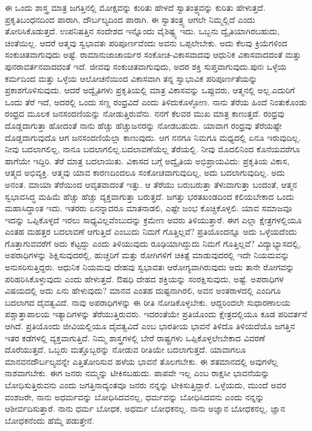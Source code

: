 ಈ ಒಂದು ಶಾಸ್ತ್ರ ಮಾತ್ರ ಜಗತ್ತಿನಲ್ಲಿ ಮೋಕ್ಷವನ್ನು ಕುರಿತು ಹೇಳದೆ ಸ್ವಾತಂತ್ರ್ಯವನ್ನು ಕುರಿತು ಹೇಳುತ್ತದೆ. ಪ್ರಕೃತಿಬಂಧನದಿಂದ ಪಾರಾಗಿ, ದೌರ್ಬಲ್ಯದಿಂದ ಪಾರಾಗಿ. ಈ ಸ್ವಾತಂತ್ರ್ಯ ಆಗಲೇ ನಿಮ್ಮಲ್ಲಿದೆ ಎಂದು ತೋರಿಸಿಕೊಡುತ್ತದೆ. ಉಪನಿಷತ್ತಿನ ಸಂದೇಶದ ಇನ್ನೊಂದು ವೈಶಿಷ್ಟ್ಯ ಇದು. ಒಬ್ಬನು ದ್ವೈತಿಯಾಗಿರಬಹುದು, ಚಿಂತೆಯಿಲ್ಲ. ಆದರೆ ಆತ್ಮವು ಸ್ವಭಾವತಃ ಪರಿಪೂರ್ಣವೆಂದು ಅವನು ಒಪ್ಪಲೇಬೇಕು. ಅದು ಕೆಲವು ಕ್ರಿಯೆಗಳಿಂದ ಸಂಕುಚಿತವಾಗುವುದು ಅಷ್ಟೆ. ರಾಮಾನುಜಾಚಾರ್ಯರ ಸಂಕೋಚ-ವಿಕಾಸವಾದವು ಆಧುನಿಕ ವಿಕಾಸವಾದದಂತೆ ಮತ್ತು ಪುನರಾವರ್ತನವಾದದಂತೆ  ಇದೆ. ಜೀವವು ಸಂಕುಚಿತವಾಗುವುದು, ಅದರ ಶಕ್ತಿ ಸುಪ್ತವಾಗುವುದು.\break ಪುನಃ ಒಳ್ಳೆಯ ಕರ್ಮದಿಂದ ಮತ್ತು ಒಳ್ಳೆಯ ಆಲೋಚನೆಯಿಂದ ವಿಕಾಸವಾಗಿ ತನ್ನ ಸ್ವಾಭಾವಿಕ ಪರಿಪೂರ್ಣತೆಯನ್ನು ಪ್ರಕಾಶಗೊಳಿಸುವುದು. ಆದರೆ ಅದ್ವೈತಿಗಳು ಪ್ರಕೃತಿಯಲ್ಲಿ ಮಾತ್ರ ವಿಕಾಸವನ್ನು ಒಪ್ಪುವರು, ಆತ್ಮನಲ್ಲಿ ಅಲ್ಲ.\break ಎದುರಿಗೆ ಒಂದು ತೆರೆ ಇದೆ, ಅದರಲ್ಲಿ ಒಂದು ಸಣ್ಣ ರಂಧ್ರವಿದೆ ಎಂದು ತಿಳಿದುಕೊಳ್ಳೋಣ. ನಾನು ತೆರೆಯ ಹಿಂದೆ ನಿಂತುಕೊಂಡು ರಂಧ್ರದ ಮೂಲಕ ಜನಸಂದಣಿಯನ್ನು ನೋಡುತ್ತಿರುವೆನು. ನನಗೆ ಕೆಲವರ ಮುಖ ಮಾತ್ರ ಕಾಣುತ್ತದೆ. ರಂಧ್ರವು ದೊಡ್ಡದಾಗುತ್ತಾ ಹೋದಂತೆ ನಾನು ಹೆಚ್ಚು ಹೆಚ್ಚು\break ಜನರನ್ನು ನೋಡಬಹುದು. ಯಾವಾಗ ರಂಧ್ರವು ತೆರೆಯಷ್ಟೇ ದೊಡ್ಡದಾಗುವುದೊ ಆಗ ಜನಸಂದಣಿಯೆಲ್ಲಾ ಕಾಣುವುದು. ಆಗ ನನಗೂ ನಿಮಗೂ ಮಧ್ಯದಲ್ಲಿ ಏನೂ ಇರುವುದಿಲ್ಲ. ನೀವು ಬದಲಾಗಲಿಲ್ಲ, ನಾನೂ ಬದಲಾಗಲಿಲ್ಲ.\break ಬದಲಾವಣೆಯೆಲ್ಲ ತೆರೆಯಲ್ಲಿ. ನೀವು ಮೊದಲಿನಿಂದ ಕೊನೆಯವರೆಗೂ ಹಾಗೆಯೇ ಇದ್ದಿರಿ. ತೆರೆ ಮಾತ್ರ ಬದಲಾಯಿತು. ವಿಕಾಸದ ಬಗ್ಗೆ ಅದ್ವೈತಿಯ ಅಭಿಪ್ರಾಯವಿದು: ಪ್ರಕೃತಿಯ ವಿಕಾಸ, ಆತ್ಮದ ಅಭಿವ್ಯಕ್ತಿ. ಆತ್ಮವು ಯಾವ ಕಾರಣದಿಂದಲೂ ಸಂಕೋಚವಾಗುವುದಿಲ್ಲ, ಅದು ಬದಲಾಗುವುದಿಲ್ಲ. ಅದು ಅನಂತ. ಮಾಯಾ ತೆರೆಯಿಂದ ಆವೃತವಾದಂತೆ ಇತ್ತು. ಆ ತೆರೆಯು ಬರುಬರುತ್ತಾ ತೆಳುವಾಗುತ್ತಾ ಬಂದಂತೆ, ಆತ್ಮನ ಸ್ವಭಾವಸಿದ್ಧ ಮಹಿಮೆ ಹೆಚ್ಚು ಹೆಚ್ಚು ವ್ಯಕ್ತವಾಗುತ್ತಾ ಬರುತ್ತದೆ. ಜಗತ್ತು ಭರತಖಂಡದಿಂದ ಕಲಿಯಬೇಕಾದ ಒಂದು ಮಹಾಸಿದ್ಧಾಂತ ಇದು. ಇತರರು ಏನನ್ನಾದರೂ ಮಾತನಾಡಲಿ, ಎಷ್ಟೇ ಜಂಭ ಕೊಚ್ಚಿಕೊಳ್ಳಲಿ. ಯಾವ ಸಮಾಜವೂ ಇದನ್ನು ಒಪ್ಪಿಕೊಳ್ಳದೆ ಇರಲು ಸಾಧ್ಯವಿಲ್ಲವೆಂಬುದನ್ನು ಕ್ರಮೇಣ ಅವರು ತಿಳಿಯುತ್ತಾರೆ. ಈಗ ಎಲ್ಲಾ ಕ್ಷೇತ್ರಗಳಲ್ಲಿಯೂ ಎಂತಹ ಮಹತ್ತರ ಬದಲಾವಣೆ ಆಗುತ್ತಿದೆ ಎಂಬುದು ನಿಮಗೆ ಗೊತ್ತಿಲ್ಲವೆ? ಪ್ರತಿಯೊಂದನ್ನೂ ಅದು ಒಳ್ಳೆಯದೆಂದು ಗೊತ್ತಾಗುವವರೆಗೆ ಅದು ಕೆಟ್ಟದ್ದು ಎಂದು ತಿಳಿಯುವುದು ರೂಢಿಯಾಗಿದ್ದುದು ನಿಮಗೆ ಗೊತ್ತಿಲ್ಲವೆ? ವಿದ್ಯಾ\-ಭ್ಯಾಸದಲ್ಲಿ, ಅಪರಾಧಿಗಳನ್ನು ಶಿಕ್ಷಿಸುವುದರಲ್ಲಿ, ಹುಚ್ಚರಿಗೆ ಮತ್ತು ರೋಗಿಗಳಿಗೆ ಚಿಕಿತ್ಸೆ ಮಾಡುವುದರಲ್ಲಿ ಇದೇ ನಿಯಮವನ್ನು ಅನುಸರಿಸುತ್ತಿದ್ದರು. ಆಧುನಿಕ ನಿಯಮವು ದೇಹವು ಸ್ವಭಾವತಃ ಆರೋಗ್ಯವಾಗಿರುವುದು ಅದು ತಾನೇ ರೋಗವನ್ನು ಪರಿಹರಿಸಿಕೊಳ್ಳುವುದು ಎಂದು ಹೇಳುತ್ತದೆ. ಔಷಧಿ ದೇಹದ ಶಕ್ತಿಯನ್ನು ಸಂರಕ್ಷಿಸುವುದು, ಅಷ್ಟೆ. ಅಪರಾಧಿಗಳ ವಿಷಯದಲ್ಲಿ ಅದು ಏನು ಹೇಳುವುದು? ಮಾನವ ಎಂತಹ ದುಷ್ಟನಾಗಿರಲಿ, ಅವನ ಅಂತರಾಳದಲ್ಲಿ ಎಂದಿಗೂ ಬದಲಾಗದ ದೈವತ್ವವಿದೆ. ನಾವು ಅಪರಾಧಿಗಳನ್ನು ಈ ರೀತಿ ನೋಡಿಕೊಳ್ಳಬೇಕು. ಆದ್ದರಿಂದಲೇ ಸುಧಾರಣಾಲಯ  ಪಶ್ಚಾತ್ತಾಪಾಲಯ  ಇತ್ಯಾದಿಗಳನ್ನು ತೆರೆಯುತ್ತಿರುವರು. ಇದರಂತೆಯೇ ಪ್ರತಿಯೊಂದು ಕ್ಷೇತ್ರದಲ್ಲಿಯೂ ಕೂಡ ಪರಿವರ್ತನೆ ಆಗಿದೆ. ಪ್ರತಿಯೊಂದು ಜೀವಿಯಲ್ಲಿಯೂ ದೈವತ್ವವಿದೆ ಎಂಬ ಭಾರತೀಯ ಭಾವನೆ ತಿಳಿದೊ ತಿಳಿಯದೆಯೊ ಜಗತ್ತಿನ ಇತರ ಕಡೆಗಳಲ್ಲಿ ವ್ಯಕ್ತವಾಗುತ್ತಿದೆ. ನಿಮ್ಮ ಶಾಸ್ತ್ರಗಳಲ್ಲಿ ಬೇರೆ ರಾಷ್ಟ್ರಗಳು ಒಪ್ಪಿಕೊಳ್ಳಲೇಬೇಕಾದ ವಿವರಣೆ ದೊರೆಯುತ್ತದೆ. ಒಬ್ಬರು ಮತ್ತೊಬ್ಬರನ್ನು ನೋಡುವ ರೀತಿಯೇ ಬದಲಾಗುತ್ತದೆ. ಯಾವಾಗಲೂ ಮಾನವನ\break ದೌರ್ಬಲ್ಯವನ್ನೇ ಎತ್ತಿತೋರಿಸುವ ಹಳೆಯ ಭಾವನೆ ತೊಲಗಬೇಕು. ಈ ಶತಮಾನದಲ್ಲಿ ಅವುಗಳೆಲ್ಲ ನಾಶವಾಗಬೇಕು. ಈಗ ಜನರು ನಮ್ಮನ್ನು ಟೀಕಿಸಬಹುದು. ಪಾಪವೇ ಇಲ್ಲ ಎಂಬ ರಾಕ್ಷಸೀ ಭಾವನೆಯನ್ನು ಬೋಧಿಸುತ್ತಿರುವನು ಎಂದು ಜಗತ್ತಿನಾದ್ಯಂತವೂ ಜನರು ನನ್ನನ್ನು ಟೀಕಿಸುತ್ತಿದ್ದಾರೆ. ಒಳ್ಳೆಯದು, ಮುಂದೆ ಅವರ ವಂಶಜರೇ, ನಾನು ಅಧರ್ಮವನ್ನು ಬೋಧಿಸಿದವನಲ್ಲ, ಧರ್ಮವನ್ನು ಬೋಧಿಸಿದವನು ಎಂದು ನನ್ನನ್ನು ಆಶೀರ್ವದಿಸುತ್ತಾರೆ. ನಾನು ಧರ್ಮ ಬೋಧಕ, ಅಧರ್ಮ ಬೋಧಕನಲ್ಲ. ನಾನು ಅಜ್ಞಾನ ಬೋಧಕನಲ್ಲ, ಜ್ಞಾನ ಬೋಧಕನೆಂದು ಹೆಮ್ಮೆ ಪಡುತ್ತೇನೆ.

